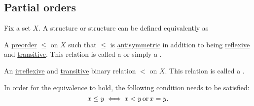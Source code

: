 \subsection{Partial orders}\label{subsec:partial_orders}

\begin{definition}\label{def:poset}
  Fix a set \( X \). A  structure or  structure can be defined equivalently as
  \begin{thmenum}
     A \hyperref[def:preordered_set]{preorder} \( \leq \) on \( X \) such that \( \leq \) is \hyperref[def:binary_relation/antisymmetric]{antisymmetric} in addition to being \hyperref[def:binary_relation/reflexive]{reflexive} and \hyperref[def:binary_relation/transitive]{transitive}. This relation is called a  or simply a .

     An \hyperref[def:binary_relation/irreflexive]{irreflexive} and \hyperref[def:binary_relation/transitive]{transitive} binary relation \( < \) on \( X \). This relation is called a .
  \end{thmenum}

  In order for the equivalence to hold, the following condition needs to be satisfied:
  \begin{equation*}
    x \leq y \iff x < y \mathop{\text{or}} x = y.
  \end{equation*}
\end{definition}
